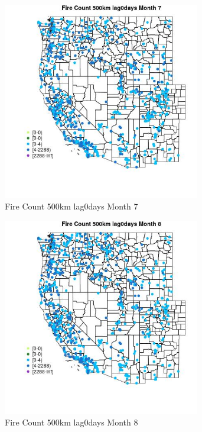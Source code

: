 \begin{figure} 
\centering  
\includegraphics[width=0.77\textwidth]{Code_Outputs/Report_ML_input_PM25_Step4_part_e_de_duplicated_aves_compiled_2019-05-21wNAs_MapObsMo7Fire_Count_500km_lag0days.jpg} 
\caption{\label{fig:Report_ML_input_PM25_Step4_part_e_de_duplicated_aves_compiled_2019-05-21wNAsMapObsMo7Fire_Count_500km_lag0days}Fire Count 500km lag0days Month 7} 
\end{figure} 
 

\begin{figure} 
\centering  
\includegraphics[width=0.77\textwidth]{Code_Outputs/Report_ML_input_PM25_Step4_part_e_de_duplicated_aves_compiled_2019-05-21wNAs_MapObsMo8Fire_Count_500km_lag0days.jpg} 
\caption{\label{fig:Report_ML_input_PM25_Step4_part_e_de_duplicated_aves_compiled_2019-05-21wNAsMapObsMo8Fire_Count_500km_lag0days}Fire Count 500km lag0days Month 8} 
\end{figure} 
 

